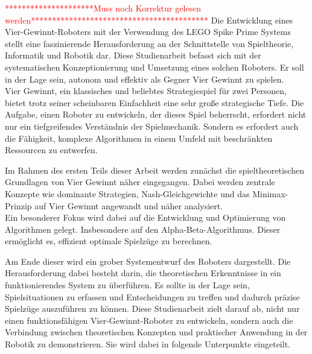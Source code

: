 \textcolor{red}{*********************Muss noch Korrektur gelesen werden******************************************}
Die Entwicklung eines Vier-Gewinnt-Roboters mit der Verwendung des LEGO Spike Prime Systems stellt eine faszinierende Herausforderung an der Schnittstelle von Spieltheorie, Informatik und Robotik dar. Diese Studienarbeit befasst sich mit der systematischen Konzeptionierung und Umsetzung eines solchen Roboters. Er soll in der Lage sein, autonom und effektiv als Gegner Vier Gewinnt zu spielen. \\
Vier Gewinnt, ein klassisches und beliebtes Strategiespiel für zwei Personen, bietet trotz seiner scheinbaren Einfachheit eine sehr große strategische Tiefe.
Die Aufgabe, einen Roboter zu entwickeln, der dieses Spiel beherrscht, erfordert nicht nur ein tiefgreifendes Verständnis der Spielmechanik. Sondern es erfordert auch die Fähigkeit, komplexe Algorithmen in einem  Umfeld  mit beschränkten Ressourcen zu entwerfen.

Im Rahmen des ersten Teils dieser Arbeit werden zunächst die spieltheoretischen Grundlagen von Vier Gewinnt näher eingegangen. Dabei werden zentrale Konzepte wie dominante Strategien, Nash-Gleichgewichte und das Minimax-Prinzip auf Vier Gewinnt angewandt und näher analysiert.\\
Ein besonderer Fokus wird dabei auf die Entwicklung und Optimierung von Algorithmen gelegt. Insbesondere auf den Alpha-Beta-Algorithmus. Dieser ermöglicht es, effizient optimale Spielzüge zu berechnen.

Am Ende dieser wird ein grober Systementwurf des Roboters dargestellt. Die Herausforderung dabei besteht darin, die theoretischen Erkenntnisse in ein funktionierendes System zu überführen. Es sollte in der Lage sein, Spielsituationen zu erfassen und Entscheidungen zu treffen und dadurch präzise Spielzüge auszuführen zu können.
Diese Studienarbeit zielt darauf ab, nicht nur einen funktionsfähigen Vier-Gewinnt-Roboter zu entwickeln, sondern auch die Verbindung zwischen theoretischen Konzepten und praktischer Anwendung in der Robotik zu demonstrieren. Sie wird dabei in folgende Unterpunkte eingeteilt.

\newpage

